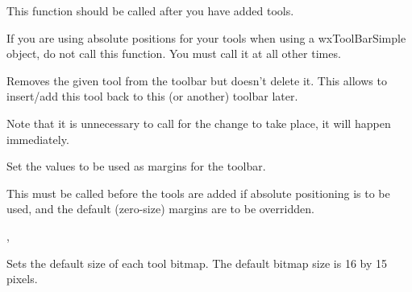 \label{wxtoolbarrealize}


This function should be called after you have added tools.

If you are using absolute positions for your tools when using a wxToolBarSimple object,
do not call this function. You must call it at all other times.

\label{wxtoolbarremovetool}


Removes the given tool from the toolbar but doesn't delete it. This allows to
insert/add this tool back to this (or another) toolbar later.

Note that it is unnecessary to call  for the
change to take place, it will happen immediately.



\label{wxtoolbarsetmargins}



Set the values to be used as margins for the toolbar.






This must be called before the tools are added if absolute positioning is to be used, and the
default (zero-size) margins are to be overridden.


, 

\label{wxtoolbarsettoolbitmapsize}


Sets the default size of each tool bitmap. The default bitmap size is 16 by 15 pixels.

